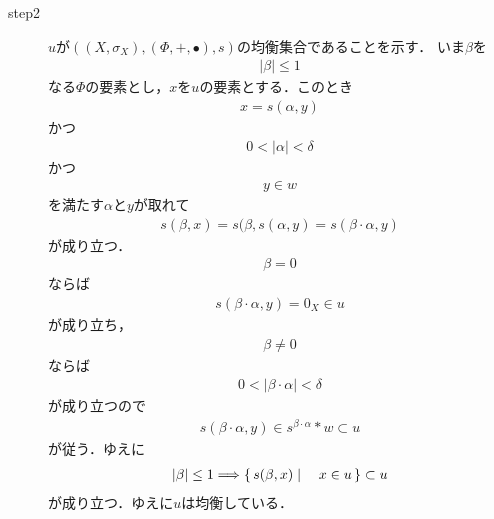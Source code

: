 \begin{sketch}
\begin{description}
			\item[step2] $u$が$\left(\left(X,\sigma_X\right),(\Phi,+,\bullet),s\right)$の均衡集合であることを示す．
				いま$\beta$を
				\begin{align}
					|\beta| \leq 1
				\end{align}
				なる$\Phi$の要素とし，$x$を$u$の要素とする．このとき
				\begin{align}
					x = s(\alpha,y)
				\end{align}
				かつ
				\begin{align}
					0 < |\alpha| < \delta
				\end{align}
				かつ
				\begin{align}
					y \in w
				\end{align}
				を満たす$\alpha$と$y$が取れて
				\begin{align}
					s(\beta,x) = s(\beta,s(\alpha,y) = s(\beta \cdot \alpha,y)
				\end{align}
				が成り立つ．
				\begin{align}
					\beta = 0
				\end{align}
				ならば
				\begin{align}
					s(\beta \cdot \alpha,y) = 0_X \in u
				\end{align}
				が成り立ち，
				\begin{align}
					\beta \neq 0
				\end{align}
				ならば
				\begin{align}
					0 < |\beta \cdot \alpha| < \delta
				\end{align}
				が成り立つので
				\begin{align}
					s(\beta \cdot \alpha,y) \in s^{\beta \cdot \alpha} \ast w \subset u
				\end{align}
				が従う．ゆえに
				\begin{align}
					|\beta| \leq 1 \Longrightarrow \left\{\, s(\beta,x) \mid \quad x \in u\, \right\} \subset u
				\end{align}
				が成り立つ．ゆえに$u$は均衡している．
				

\end{description}
\end{sketch}
